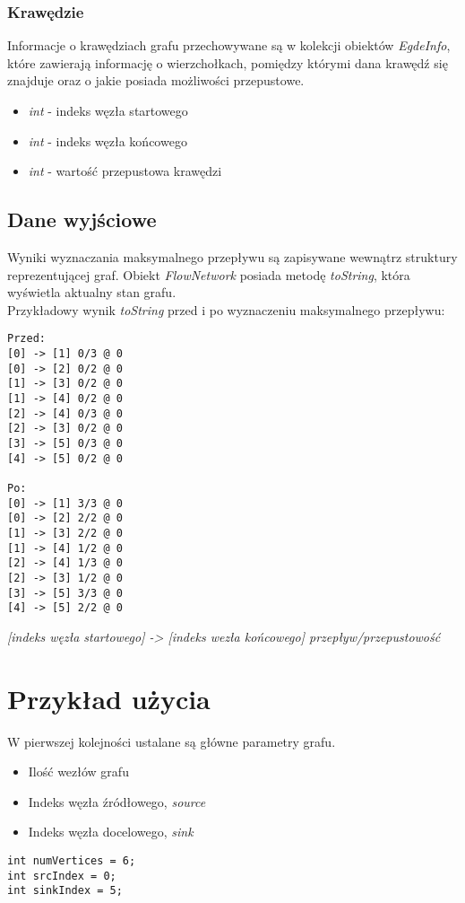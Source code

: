 \documentclass[10pt]{dokument-tiwo}
\begin{document}
\subsubsection{Krawędzie}
Informacje o krawędziach grafu przechowywane są w kolekcji obiektów \emph{EgdeInfo}, które zawierają informację o wierzchołkach,
pomiędzy którymi dana krawędź się znajduje oraz o jakie posiada możliwości przepustowe.
\begin{itemize}
  \item \emph{int} - indeks węzła startowego
  \item \emph{int} - indeks węzła końcowego
  \item \emph{int} - wartość przepustowa krawędzi
\end{itemize}

\subsection{Dane wyjściowe}
Wyniki wyznaczania maksymalnego przepływu są zapisywane wewnątrz struktury reprezentującej graf. Obiekt \emph{FlowNetwork} posiada metodę \emph{toString}, która wyświetla aktualny stan grafu.\\
Przykładowy wynik \emph{toString} przed i po wyznaczeniu maksymalnego przepływu:
\begin{lstlisting}
Przed:
[0] -> [1] 0/3 @ 0
[0] -> [2] 0/2 @ 0
[1] -> [3] 0/2 @ 0
[1] -> [4] 0/2 @ 0
[2] -> [4] 0/3 @ 0
[2] -> [3] 0/2 @ 0
[3] -> [5] 0/3 @ 0
[4] -> [5] 0/2 @ 0

Po:
[0] -> [1] 3/3 @ 0
[0] -> [2] 2/2 @ 0
[1] -> [3] 2/2 @ 0
[1] -> [4] 1/2 @ 0
[2] -> [4] 1/3 @ 0
[2] -> [3] 1/2 @ 0
[3] -> [5] 3/3 @ 0
[4] -> [5] 2/2 @ 0
\end{lstlisting}
\emph{[indeks węzła startowego] -> [indeks wezła końcowego] przepływ/przepustowość}

\section{Przykład użycia}
W pierwszej kolejności ustalane są główne parametry grafu.
\begin{itemize}
\item Ilość wezłów grafu
\item Indeks węzła źródłowego, \emph{source}
\item Indeks węzła docelowego, \emph{sink}
\end{itemize}
\begin{lstlisting}
int numVertices = 6;
int srcIndex = 0;
int sinkIndex = 5;
\end{lstlisting}
\end{document}
